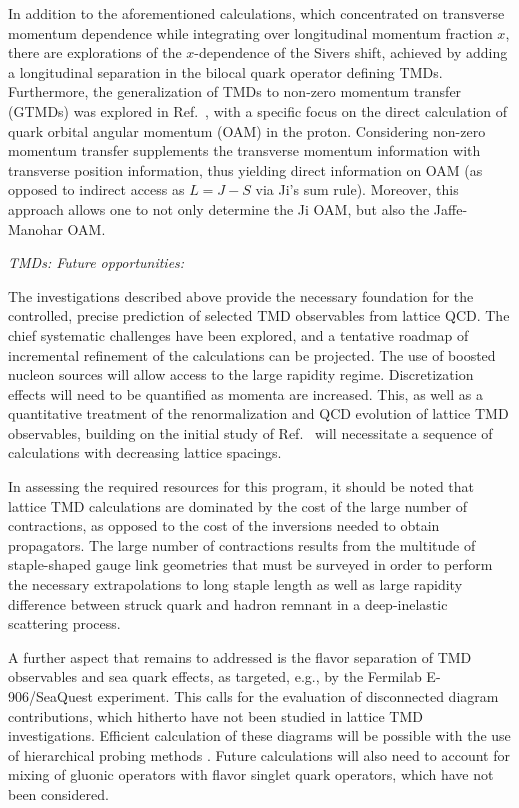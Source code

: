 In addition to the aforementioned calculations, which concentrated on
transverse momentum dependence while integrating over longitudinal
momentum fraction $x$, there are explorations of the
$x$-dependence of the Sivers shift, achieved by adding a
longitudinal separation in the bilocal quark operator defining TMDs.
Furthermore, the generalization
of TMDs to non-zero momentum transfer (GTMDs) was explored in
Ref.~\cite{Engelhardt:2017miy}, with a specific focus on the direct
calculation of quark orbital angular momentum (OAM) in the proton.
Considering non-zero momentum transfer supplements the transverse
momentum information with transverse position information, thus
yielding direct information on OAM (as opposed to indirect access
as $L=J-S$ via Ji's sum rule). Moreover, this approach allows one
to not only determine the Ji OAM, but also the Jaffe-Manohar OAM.

{\it TMDs: Future opportunities:}

The investigations described above provide the necessary foundation for
the controlled, precise prediction of selected TMD observables from
lattice QCD. The chief systematic challenges have been explored,
and a tentative roadmap of incremental refinement of the calculations can
be projected. The use of boosted nucleon sources will allow access to the large
rapidity regime. Discretization effects will need to be quantified
as momenta are increased. This, as well as a quantitative treatment
of the renormalization and QCD evolution of lattice TMD observables,
building on the initial study of Ref.~\cite{Yoon:2017qzo} will necessitate a
sequence of calculations with decreasing lattice spacings.

In assessing the required resources for this program, it should be noted that lattice
TMD calculations are dominated by the cost of the large number of
contractions, as opposed to the cost of the inversions needed to
obtain propagators. The large number of contractions results from the multitude of
staple-shaped gauge link geometries that must be surveyed in order
to perform the necessary extrapolations to long staple length as
well as large rapidity difference between struck quark and hadron
remnant in a deep-inelastic scattering process. 

A further aspect that remains to addressed is the flavor separation
of TMD observables and sea quark effects, as targeted, e.g., by the Fermilab
E-906/SeaQuest experiment. This calls for the evaluation of disconnected
diagram contributions, which hitherto have not been studied in lattice TMD
investigations. Efficient calculation of these diagrams will be possible
with the use of hierarchical probing methods \cite{Stathopoulos:2013aci}.
Future calculations will also need to account for mixing of gluonic
operators with flavor singlet quark operators, which have not been considered.

